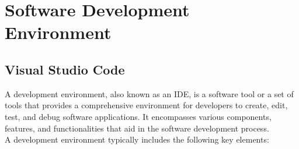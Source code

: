 \chapter{Software Development Environment}

\section{Visual Studio Code}
A development environment, also known as an \ac{IDE}, is a software tool or a set of tools that provides a comprehensive environment for developers to create, edit, test, and debug software applications. It encompasses various components, features, and functionalities that aid in the software development process.\vspace{5mm} \\
A development environment typically includes the following key elements:
